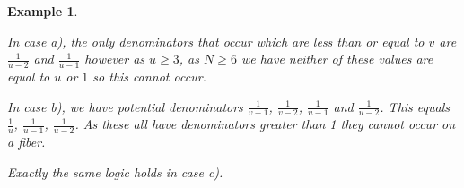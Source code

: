 \documentclass[12pt]{amsart}
\theoremstyle{plain}
\newtheorem{ex}[thm]{Example}
\begin{document}
\begin{ex}
\begin{itemize}
In case a), the only denominators that occur which are less than or equal to $v$ are $\frac{1}{u-2}$ and $\frac{1}{u-1}$ however as $u \geq 3$, as $N \geq 6$ we have neither of these values are equal to $u$ or $1$ so this cannot occur.

In case b), we have potential denominators $\frac{1}{v-1}$, $\frac{1}{v-2}$, $\frac{1}{u-1}$ and $\frac{1}{u-2}$. This equals $\frac{1}{u}$, $\frac{1}{u-1}$, $\frac{1}{u-2}$. As these all have denominators greater than 1 they cannot occur on a fiber. 

Exactly the same logic holds in case c).


\end{itemize}
\end{ex}



\begin{comment}

\begin{thebibliography}{10}

\bibitem{ZDQ}
Z. DeQi:
\newblock{ Logarithmic del Pezzo surfaces of rank one with contractible boundaries}
\newblock{Osaka Journal of Mathematics 25 (1988), 461-497}

\bibitem{Suss} 
H. S{\"u}ss:
\newblock Canonical Divisors on T-Varieties
\newblock{arxiv:0811.0626}

\bibitem{Huggenberger}
E. Huggenberger:
\newblock{ Fano Varieties with Torus Action of Complexity One}
\newblock{Thesis at Universität Tübingen, 2013.}


\bibitem{IMT}
N. Ilten, M. Mishna and C. Trainor:
\newblock{ Classifying Fano Complexity-One T-Varieties via Divisorial Polytopes}
\newblock{To appear in Manuscripta Mathematica}
\newblock{arXiv:1710.04146}

\bibitem{H1}
D. Hwang:
\newblock{ Picard rank one Log del Pezzos}
\newblock{Forthcoming}

\bibitem{H2}
D. Hwang:
\newblock{Cascades of Toric varieties}
\newblock{Unpublished draft version}

\bibitem{Sakai}
F. Sakai:
\newblock{ Anitcanonical models of rational surfaces}
\newblock{Math. Ann. 269 (1984),}
\newblock{no. 3, 389-410.}

\bibitem{CH}
A. Corti and L. Heuberger:
\newblock{ Del Pezzo surfaces with $\frac{1}{3}(1,1)$ points}
\newblock{ Manuscripta Mathematica, May 2017, Volume 152}
\newblock{arXiv:1505.02092}

\bibitem{CP}
D. Cavey and T.Prince:
\newblock{Del Pezzo surfaces with a single 1/k(1,1) singularity,}
\newblock{arXiv:1707.09213}


\end{comment}
\end{document}
